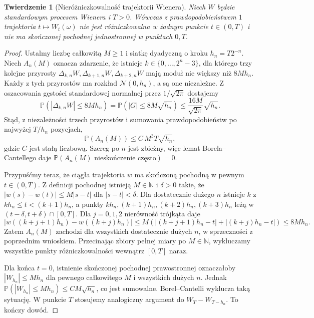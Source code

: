 \documentclass[11pt,a4paper,oneside]{report}
\numberwithin{equation}{chapter}
\theoremstyle{plain}
\newtheorem{twierdzenie}{Twierdzenie}[chapter]
\theoremstyle{definition}
\theoremstyle{remark}
\newcommand{\N}{\mathbb{N}}
\newcommand{\Prob}{\mathbb{P}}
\newcommand{\Normal}{\mathcal{N}}
\begin{document}
\begin{twierdzenie}[Nieróżniczkowalność trajektorii Wienera]
Niech $W$ będzie standardowym procesem Wienera i $T>0$.
Wówczas z prawdopodobieństwem $1$ trajektoria
$t\mapsto W_t(\omega)$ nie jest różniczkowalna
w żadnym punkcie $t\in(0,T)$ i nie ma skończonej
pochodnej jednostronnej w punktach $0,T$.
\end{twierdzenie}
\begin{proof}
Ustalmy liczbę całkowitą $M\ge1$ i siatkę dyadyczną
o kroku $h_n=T2^{-n}$. Niech $A_n(M)$ oznacza zdarzenie,
że istnieje $k\in\{0,\ldots,2^n-3\}$, dla którego
trzy kolejne przyrosty
$\Delta_{k,n}W,\Delta_{k+1,n}W,\Delta_{k+2,n}W$
mają moduł nie większy niż $8Mh_n$.
Każdy z tych przyrostów ma rozkład $\Normal(0,h_n)$,
a są one niezależne. Z oszacowania gęstości standardowej
normalnej przez $1/\sqrt{2\pi}$ dostajemy
\[
\Prob(|\Delta_{k,n}W|\le8Mh_n)
=\Prob(|G|\le8M\sqrt{h_n})
\le \frac{16M}{\sqrt{2\pi}}\sqrt{h_n}.
\]
Stąd, z niezależności trzech przyrostów i sumowania
prawdopodobieństw po najwyżej $T/h_n$ pozycjach,
\[
\Prob(A_n(M))\le C\,M^3T\sqrt{h_n},
\]
gdzie $C$ jest stałą liczbową. Szereg po $n$ jest zbieżny,
więc lemat Borela--Cantellego daje
$\Prob(A_n(M)\text{ nieskończenie często})=0$.

Przypuśćmy teraz, że ciągła trajektoria $w$ ma skończoną
pochodną w pewnym $t\in(0,T)$. Z definicji pochodnej
istnieją $M\in\N$ i $\delta>0$ takie, że
$|w(s)-w(t)|\le M|s-t|$ dla $|s-t|<\delta$.
Dla dostatecznie dużego $n$ istnieje $k$ z
$kh_n\le t<(k+1)h_n$, a punkty
$kh_n,(k+1)h_n,(k+2)h_n,(k+3)h_n$
leżą w $(t-\delta,t+\delta)\cap[0,T]$.
Dla $j=0,1,2$ nierówność trójkąta daje
\[
|w((k+j+1)h_n)-w((k+j)h_n)|
\le M(|(k+j+1)h_n-t|+|(k+j)h_n-t|)
\le 8Mh_n.
\]
Zatem $A_n(M)$ zachodzi dla wszystkich dostatecznie
dużych $n$, w sprzeczności z poprzednim wnioskiem.
Przecinając zbiory pełnej miary po $M\in\N$,
wykluczamy wszystkie punkty różniczkowalności wewnątrz
$[0,T]$ naraz.

Dla końca $t=0$, istnienie skończonej pochodnej
prawostronnej oznaczałoby $|W_{h_n}|\le Mh_n$
dla pewnego całkowitego $M$ i wszystkich dużych $n$.
Jednak $\Prob(|W_{h_n}|\le Mh_n)\le C M\sqrt{h_n}$,
co jest sumowalne. Borel--Cantelli wyklucza taką
sytuację. W punkcie $T$ stosujemy analogiczny argument
do $W_T-W_{T-h_n}$. To kończy dowód.
\end{proof}
\end{document}
